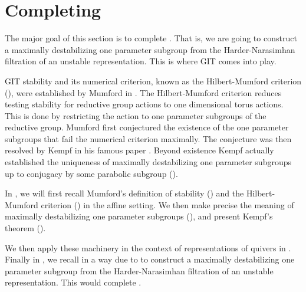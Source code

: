 \documentclass[a4paper]{amsart}
\numberwithin{equation}{section}
\theoremstyle{plain}
\theoremstyle{definition}
\begin{document}
\section{Completing \texorpdfstring{}{Theorem B}}\label{from_HN_to_OPS}
The major goal of this section is to complete . That is, we are going to construct a maximally destabilizing one parameter subgroup from the Harder-Narasimhan filtration of an unstable representation. This is where GIT comes into play. 

GIT stability and its numerical criterion, known as the Hilbert-Mumford criterion (), were established by Mumford in \cite{MR1304906}. The Hilbert-Mumford criterion reduces testing stability for reductive group actions to one dimensional torus actions. This is done by restricting the action to one parameter subgroups of the reductive group. Mumford first  conjectured the existence of the one parameter subgroups that fail the numerical criterion maximally. The conjecture was then resolved by Kempf in his famous paper \cite{MR506989}. Beyond existence Kempf actually established the uniqueness of maximally destabilizing one parameter subgroups up to conjugacy by some parabolic subgroup ().

In , we will first recall Mumford's definition of stability () and the Hilbert-Mumford criterion () in the affine setting. We then make precise the meaning of maximally destabilizing one parameter subgroups (), and present Kempf's theorem ().

We then apply these machinery in the context of representations of quivers in . Finally in , we recall in  a way due to \cite{MR3199484} to construct a maximally destabilizing one parameter subgroup from the Harder-Narasimhan filtration of an unstable representation. This would complete .
\end{document}
